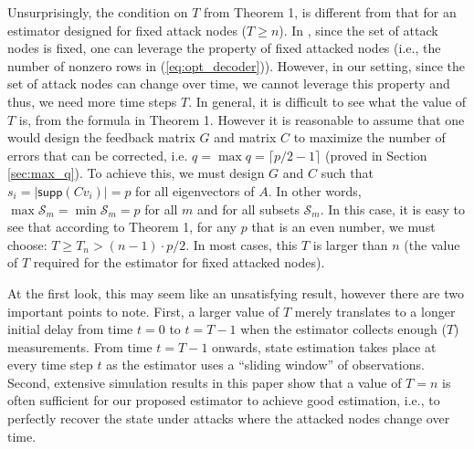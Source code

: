 \documentclass[../../thesis.tex]{subfiles}
\begin{document}
Unsurprisingly, the condition on $T$ from Theorem 1, is different from that for an estimator designed for fixed attack nodes ($T\geq n$). In \cite{Fawzi:2014}, since the set of attack nodes is fixed, one can leverage the property of fixed attacked nodes (i.e., the number of nonzero rows in (\ref{eq:opt_decoder})). However, in our setting, since the set of attack nodes can change over time, we cannot leverage this property and thus, we need more time steps $T$.
In general, it is difficult to see what the value of $T$ is, from the formula in Theorem 1. However it is reasonable to assume that one would design the feedback matrix $G$ and matrix $C$ to maximize the number of errors that can be corrected, i.e. $q = \max q = \lceil p/2 - 1 \rceil$ (proved in Section \ref{sec:max_q}). To achieve this, we must design $G$ and $C$ such that $s_i = \lvert \textsf{supp} (C v_i) \rvert = p$ for all eigenvectors of $A$. In other words, $\operatorname{max} \mathcal{S}_m = \operatorname{min} \mathcal{S}_m = p$ for all $m$ and for all subsets $\mathcal{S}_m$. 
In this case, it is easy to see that according to Theorem 1, for any $p$ that is an even number, we must choose: $T\geq T_n > (n-1) \cdot p/2$.
In most cases, this $T$ is larger than $n$ (the value of $T$ required for the estimator for fixed attacked nodes).

At the first look, this may seem like an unsatisfying result, however there are two important points to note. First, a larger value of $T$ merely translates to a longer initial delay from time $t = 0$ to $t=T-1$ when the estimator collects enough ($T$) measurements. From time $t=T-1$ onwards, state estimation takes place at every time step $t$ as the estimator uses a ``sliding window'' of observations. Second, extensive simulation results in this paper show that a value of $T = n$ is often sufficient for our proposed estimator to achieve good estimation, i.e., to perfectly recover the state under attacks where the attacked nodes change over time. 
\end{document}
